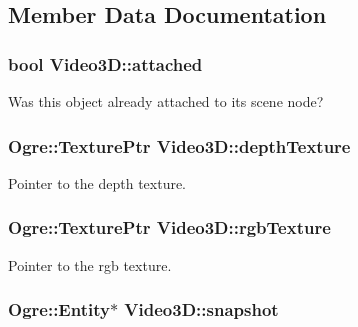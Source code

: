 \subsection{\-Member \-Data \-Documentation}
\hypertarget{classVideo3D_a4dc5c42b3005ccf0e6e9cffd26a6351d}{
\subsubsection[{attached}]{\setlength{\rightskip}{0pt plus 5cm}bool {\bf \-Video3\-D\-::attached}}}\label{classVideo3D_a4dc5c42b3005ccf0e6e9cffd26a6351d}
\-Was this object already attached to its scene node? \hypertarget{classVideo3D_a1e9d633a5ac0c2b2468611190c2bba12}{
\subsubsection[{depth\-Texture}]{\setlength{\rightskip}{0pt plus 5cm}\-Ogre\-::\-Texture\-Ptr {\bf \-Video3\-D\-::depth\-Texture}}}\label{classVideo3D_a1e9d633a5ac0c2b2468611190c2bba12}
\-Pointer to the depth texture. \hypertarget{classVideo3D_ae6ddba8b94b5f01dc4761255fcffdf81}{
\subsubsection[{rgb\-Texture}]{\setlength{\rightskip}{0pt plus 5cm}\-Ogre\-::\-Texture\-Ptr {\bf \-Video3\-D\-::rgb\-Texture}}}\label{classVideo3D_ae6ddba8b94b5f01dc4761255fcffdf81}
\-Pointer to the rgb texture. \hypertarget{classVideo3D_ab8d19ec21e20d8e4fcb921db1f05c96e}{
\subsubsection[{snapshot}]{\setlength{\rightskip}{0pt plus 5cm}\-Ogre\-::\-Entity$\ast$ {\bf \-Video3\-D\-::snapshot}}}\label{classVideo3D_ab8d19ec21e20d8e4fcb921db1f05c96e}
